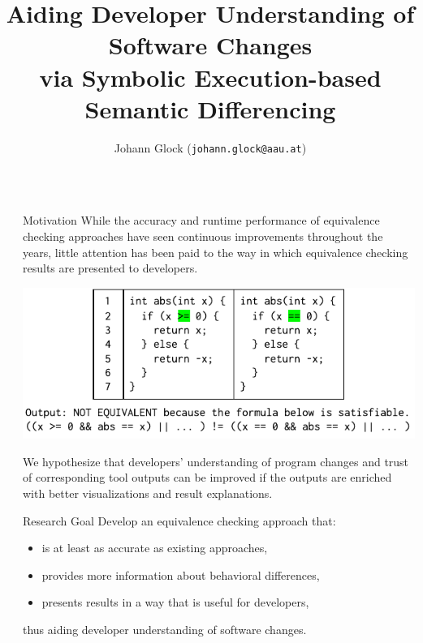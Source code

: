 \documentclass[final,hyperref={pdfpagelabels=false}]{beamer}
\title{\fontsize{45}{45}\selectfont{}Aiding Developer Understanding of Software Changes\\[18pt]via Symbolic Execution-based Semantic Differencing} %
\author{Johann Glock (\texttt{johann.glock@aau.at})}
\institute{Software Engineering Research Group, University of Klagenfurt}
\newcommand{\shrink}{-15pt}
\begin{document}

\begin{frame}[t] %

\begin{columns}[t] %

  \begin{column}{.04\textwidth}\end{column} %

  \begin{column}{.45\textwidth} %
    \vspace{\shrink}
    \begin{block}{Motivation}
      While the accuracy and runtime performance of equivalence checking approaches have seen continuous improvements throughout the years, little attention has been paid to the way in which equivalence checking results are presented to developers.

      \vspace{10pt}
      \begin{center}
        \includegraphics[width=\columnwidth]{code-example.drawio}
      \end{center}
      \vspace{-7.5pt}

      We hypothesize that developers' understanding of program changes and trust of corresponding tool outputs can be improved if the outputs are enriched with better visualizations and result explanations.
    \end{block}

    \begin{block}{Research Goal}
      Develop an equivalence checking approach that:
      \begin{itemize}
        \item is at least as accurate as existing approaches,
        \item provides more information about behavioral differences,
        \item presents results in a way that is useful for developers,
      \end{itemize}
      thus aiding developer understanding of software changes.
    \end{block}


\end{column}
\end{columns}
\end{frame}
\end{document}
